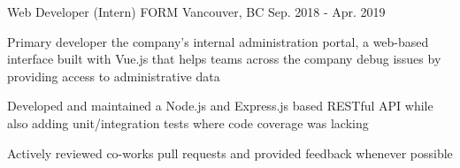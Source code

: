 \begin{cventries}
  \cventry
    {Web Developer (Intern)} %
    {FORM} %
    {Vancouver, BC} %
    {Sep. 2018 - Apr. 2019} %
    {
      \begin{cvitems} %
        \item {Primary developer the company's internal administration portal, a web-based interface built with Vue.js that helps teams across the company debug issues by providing access to administrative data}
        \item {Developed and maintained a Node.js and Express.js based RESTful API while also adding unit/integration tests where code coverage was lacking}
        \item {Actively reviewed co-works pull requests and provided feedback whenever possible}
      \end{cvitems}
    }
\end{cventries}
